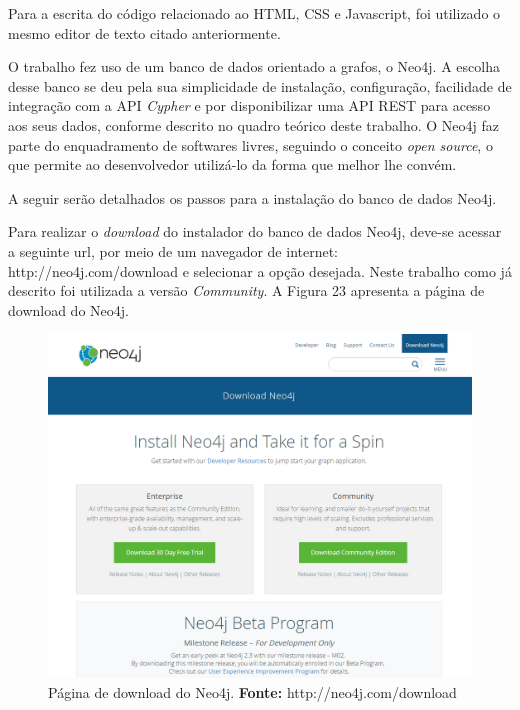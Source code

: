\par Para a escrita do código relacionado ao HTML, CSS e Javascript, foi utilizado o mesmo editor de texto citado anteriormente.

\par O trabalho fez uso de um banco de dados orientado a grafos, o Neo4j. A escolha desse banco se deu pela sua simplicidade de instalação, configuração, facilidade de integração com a API \textit{Cypher} e por disponibilizar uma API REST para acesso aos seus dados, conforme descrito no quadro teórico deste trabalho. O Neo4j faz parte do enquadramento de softwares livres, seguindo o conceito \textit{open source}, o que permite ao desenvolvedor utilizá-lo da forma que melhor lhe convém. 


\par A seguir serão detalhados os passos para a instalação do banco de dados Neo4j.

\par Para realizar o \textit{download} do instalador do banco de dados Neo4j, deve-se acessar a seguinte url, por meio de um  navegador de internet: http://neo4j.com/download e selecionar a opção desejada. Neste trabalho como já descrito foi utilizada a versão \textit{Community}. A Figura 23 apresenta a página de download do Neo4j.

\newpage
\begin{figure}[h!]
	\centerline{\includegraphics[scale=0.4]{./imagens/download-neo4j.png}}
	\caption[Página de download do Neo4j]
	{Página de download do Neo4j. \textbf{Fonte:} http://neo4j.com/download}
	\label{fig:exemplo1}
\end{figure}

